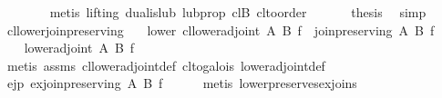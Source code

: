 \begin{isabellebody}
\ \ \ \ \ \ \isamarkupfalse%
\ {}metis\ {}lifting{}\ dual{}is{}lub\ lub{}prop\ cl{}B\ cl{}to{}order{}\isanewline
\ \ \isamarkupfalse%
\isanewline
\isanewline
\ \ \isamarkupfalse%
\ {}thesis\ \isamarkupfalse%
\ simp\isanewline
{}\isamarkupfalse%
%
\endisatagproof
{\isafoldproof}%
%
\isadelimproof
\isanewline
%
\endisadelimproof
\isanewline
\isanewline
\isanewline
{}\isamarkupfalse%
\ cl{}lower{}join{}preserving{}\isanewline
\ \ \ lower{}\ {}cl{}lower{}adjoint\ A\ B\ f{}\ \ {}join{}preserving\ A\ B\ f{}\isanewline
%
\isadelimproof
%
\endisadelimproof
%
\isatagproof
{}\isamarkupfalse%
\ {}\isanewline
\ \ \isamarkupfalse%
\ {}lower{}adjoint\ A\ B\ f{}\isanewline
\ \ \ \ \isamarkupfalse%
\ {}metis\ assms\ cl{}lower{}adjoint{}def\ cl{}to{}galois\ lower{}adjoint{}def{}\isanewline
\ \ \isamarkupfalse%
\ ejp{}\ {}ex{}join{}preserving\ A\ B\ f{}\isanewline
\ \ \ \ \isamarkupfalse%
\ {}metis\ lower{}preserves{}ex{}joins{}\isanewline

\end{isabellebody}
